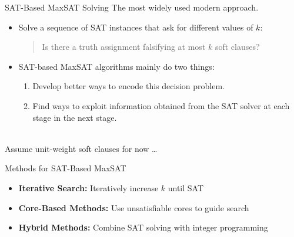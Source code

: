 \documentclass[t,english]{sdqbeamer}
\begin{document}
\begin{frame}{SAT-Based MaxSAT Solving}
The most widely used modern approach.~\\[1ex]
\begin{itemize}\itemsep1ex
	\item Solve a sequence of SAT instances that ask for different values of $k$:
	\begin{quote}
	Is there a truth assignment falsifying at most $k$ soft clauses?
	\end{quote}
	\item SAT-based MaxSAT algorithms mainly do two things:\\[1ex]
	\begin{enumerate}\itemsep1em
	\item Develop better ways to encode this decision problem.
	\item Find ways to exploit information obtained from the SAT solver at each stage in the next stage.
	\end{enumerate}
\end{itemize}~\\
Assume unit-weight soft clauses for now \dots

\begin{block}{Methods for SAT-Based MaxSAT}
\begin{itemize}\itemsep1em
  \item \textbf{Iterative Search:} Iteratively increase $k$ until SAT
  \item \textbf{Core-Based Methods:} Use unsatisfiable cores to guide search
  \item \textbf{Hybrid Methods:} Combine SAT solving with integer programming
\end{itemize}
\end{block}
\end{frame}
\end{document}
